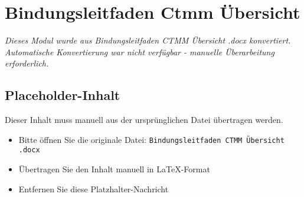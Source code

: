 
\section{Bindungsleitfaden Ctmm Übersicht}
\label{sec:bindungsleitfaden-ctmm-übersicht-}

\begin{center}
\textit{Dieses Modul wurde aus Bindungsleitfaden CTMM Übersicht .docx konvertiert.\\
Automatische Konvertierung war nicht verfügbar - manuelle Überarbeitung erforderlich.}
\end{center}


\subsection{Placeholder-Inhalt}

Dieser Inhalt muss manuell aus der ursprünglichen Datei übertragen werden.

\begin{itemize}
\item Bitte öffnen Sie die originale Datei: \texttt{Bindungsleitfaden CTMM Übersicht .docx}
\item Übertragen Sie den Inhalt manuell in LaTeX-Format
\item Entfernen Sie diese Platzhalter-Nachricht
\end{itemize}
